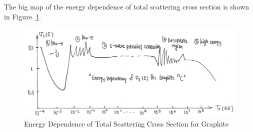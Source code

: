 \documentclass{school-22.101-notes}
\date{December 5, 2011}
\begin{document}
\maketitle

The big map of the energy dependence of total scattering cross section is shown in Figure~\ref{sigma-vs-T}.
\begin{figure}[ht]
    \centering
    \includegraphics[width=5in]{images/ni/sigma-vs-T.png}
    \caption{Energy Dependence of Total Scattering Cross Section for Graphite\label{sigma-vs-T}}
\end{figure}
\end{document}
